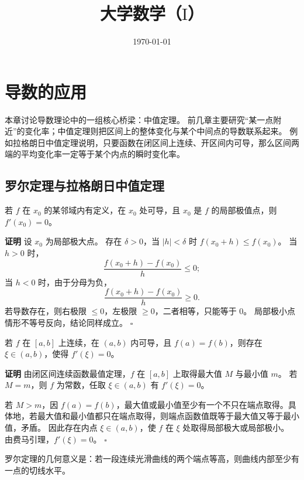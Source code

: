 \documentclass[fontset=fandol]{ctexart}
\title{大学数学（$ \mathrm{I} $）}
\author{}
\date{\today}
\newenvironment{proofdetail}{\par\noindent\textbf{证明}\quad}{\hfill$\square$\par\vspace{0.8em}}
\begin{document}
\maketitle
\vspace{-1em}


\section{导数的应用}

本章讨论导数理论中的一组核心桥梁：中值定理。 前几章主要研究“某一点附近”的变化率；中值定理则把区间上的整体变化与某个中间点的导数联系起来。 例如拉格朗日中值定理说明，只要函数在闭区间上连续、开区间内可导，那么区间两端的平均变化率一定等于某个内点的瞬时变化率。




\subsection{罗尔定理与拉格朗日中值定理}

\begin{theorem}[费马（Fermat）引理]
若 $f$ 在 $x_0$ 的某邻域内有定义，在 $x_0$ 处可导，且 $x_0$ 是 $f$ 的局部极值点，则 $f'(x_0)=0$。
\end{theorem}
\begin{proofdetail}
设 $x_0$ 为局部极大点。 存在 $\delta>0$，当 $|h|<\delta$ 时 $f(x_0+h)\leq f(x_0)$。 当 $h>0$ 时，
\[
\frac{f(x_0+h)-f(x_0)}{h}\leq0;
\]
当 $h<0$ 时，由于分母为负，
\[
\frac{f(x_0+h)-f(x_0)}{h}\geq0.
\]
若导数存在，则右极限 $\leq0$，左极限 $\geq0$，二者相等，只能等于 $0$。 局部极小点情形不等号反向，结论同样成立。
\end{proofdetail}

\begin{theorem}[罗尔定理]
若 $f$ 在 $[a,b]$ 上连续，在 $(a,b)$ 内可导，且 $f(a)=f(b)$，则存在 $\xi\in(a,b)$，使得 $f'(\xi)=0$。
\end{theorem}
\begin{proofdetail}
由闭区间连续函数最值定理，$f$ 在 $[a,b]$ 上取得最大值 $M$ 与最小值 $m$。 若 $M=m$，则 $f$ 为常数，任取 $\xi\in(a,b)$ 有 $f'(\xi)=0$。

若 $M>m$，因 $f(a)=f(b)$，最大值或最小值至少有一个不只在端点取得。具体地，若最大值和最小值都只在端点取得，则端点函数值既等于最大值又等于最小值，矛盾。 因此存在内点 $\xi\in(a,b)$，使 $f$ 在 $\xi$ 处取得局部极大或局部极小。 由费马引理，$f'(\xi)=0$。
\end{proofdetail}

罗尔定理的几何意义是：若一段连续光滑曲线的两个端点等高，则曲线内部至少有一点的切线水平。
\end{document}
